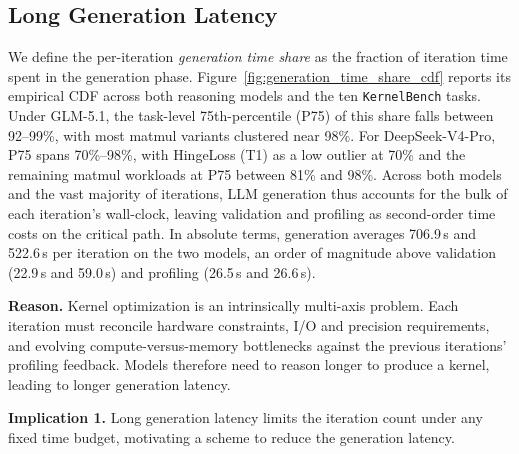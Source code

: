 \subsection{Long Generation Latency}\label{subsec:gen_dominates}

We define the per-iteration \emph{generation time share} as the fraction of iteration time spent in the generation phase.
Figure~\ref{fig:generation_time_share_cdf} reports its empirical CDF across both reasoning models and the ten \texttt{KernelBench} tasks.
Under GLM-5.1, the task-level 75th-percentile (P75) of this share falls between 92--99\%, with most matmul variants clustered near 98\%. For DeepSeek-V4-Pro, P75 spans 70\%--98\%, with HingeLoss (T1) as a low outlier at 70\% and the remaining matmul workloads at P75 between 81\% and 98\%.
Across both models and the vast majority of iterations, LLM generation thus accounts for the bulk of each iteration's wall-clock, leaving validation and profiling as second-order time costs on the critical path.
In absolute terms, generation averages 706.9\,s and 522.6\,s per iteration on the two models, an order of magnitude above validation (22.9\,s and 59.0\,s) and profiling (26.5\,s and 26.6\,s).

\noindent\textbf{Reason.}
Kernel optimization is an intrinsically multi-axis problem. Each iteration must reconcile hardware constraints,
I/O and precision requirements, and evolving compute-versus-memory bottlenecks against the previous iterations' profiling
feedback. Models therefore need to reason longer to produce a kernel, leading to longer generation latency.

\noindent\textbf{Implication 1.} Long generation latency limits the iteration count under any fixed time budget, motivating a scheme to reduce the generation latency.

